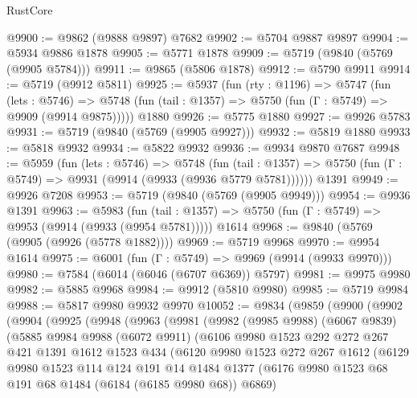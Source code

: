 \begin{lexlean}{RustCore}
\begin{coremodule}
{\begin{coremodule}
{{{{{{{{{{{{{{{{{{{{{{{{{{{{{{{{{{{{{{{{{{{{@9900 := @9862 (@9888 @9897) @7682
@9902 := @5704 @9887 @9897
@9904 := @5934 @9886 @1878
@9905 := @5771 @1878
@9909 := @5719 (@9840 (@5769 (@9905 @5784)))
@9911 := @9865 (@5806 @1878)
@9912 := @5790 @9911
@9914 := @5719 (@9912 @5811)
@9925 := @5937
    (fun (rty : @1196) =>
    @5747
      (fun (lets : @5746) =>
      @5748 (fun (tail : @1357) => @5750 (fun (Γ : @5749) => @9909 (@9914 @9875)))))
    @1880
@9926 := @5775 @1880
@9927 := @9926 @5783
@9931 := @5719 (@9840 (@5769 (@9905 @9927)))
@9932 := @5819 @1880
@9933 := @5818 @9932
@9934 := @5822 @9932
@9936 := @9934 @9870 @7687
@9948 := @5959
    (fun (lets : @5746) =>
    @5748
      (fun (tail : @1357) => @5750 (fun (Γ : @5749) => @9931 (@9914 (@9933 (@9936 @5779 @5781))))))
    @1391
@9949 := @9926 @7208
@9953 := @5719 (@9840 (@5769 (@9905 @9949)))
@9954 := @9936 @1391
@9963 := @5983
    (fun (tail : @1357) => @5750 (fun (Γ : @5749) => @9953 (@9914 (@9933 (@9954 @5781)))))
    @1614
@9968 := @9840 (@5769 (@9905 (@9926 (@5778 @1882))))
@9969 := @5719 @9968
@9970 := @9954 @1614
@9975 := @6001 (fun (Γ : @5749) => @9969 (@9914 (@9933 @9970)))
@9980 := @7584 (@6014 (@6046 (@6707 @6369)) @5797)
@9981 := @9975 @9980
@9982 := @5885 @9968
@9984 := @9912 (@5810 @9980)
@9985 := @5719 @9984
@9988 := @5817 @9980 @9932 @9970
@10052 := @9834
    (@9859
      (@9900
        (@9902
          (@9904
            (@9925
              (@9948
                (@9963
                  (@9981
                    (@9982
                      (@9985 @9988)
                      (@6067 @9839)
                      (@5885
                        @9984
                        @9988
                        (@6072 @9911)
                        (@6106
                          @9980
                          @1523
                          @292
                          @272
                          @267
                          @421
                          @1391
                          @1612
                          @1523
                          @434
                          (@6120
                            @9980
                            @1523
                            @272
                            @267
                            @1612
                            (@6129
                              @9980
                              @1523
                              @114
                              @124
                              @191
                              @14
                              @1484
                              @1377
                              (@6176 @9980 @1523 @68 @191 @68 @1484 (@6184 (@6185 @9980 @68)) @6869)
}}}}}}}}}}}}}}}}}}}}}}}}}}}}}}}}}}}}}}}}}}}}
\end{coremodule}}
\end{coremodule}
\end{lexlean}

